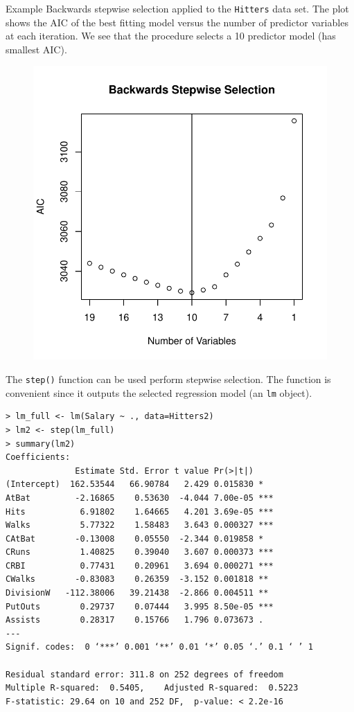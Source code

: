 \documentclass[10pt]{beamer}\usepackage[]{graphicx}\usepackage[]{color}
\begin{document}
\begin{frame}{Example}
Backwards stepwise selection applied to the \texttt{Hitters} data set. The plot shows the AIC of the best fitting model versus the number of predictor variables at each iteration.  We see that the procedure selects a 10 predictor model (has smallest AIC). 
\begin{figure}
\includegraphics[scale=0.5]{figure/bwdAIC}
\end{figure}
\end{frame}

\begin{frame}[fragile]
The \texttt{step()} function can be used perform stepwise selection.  The function is convenient since it outputs the selected regression model (an \texttt{lm} object).
\scriptsize
\begin{verbatim}
> lm_full <- lm(Salary ~ ., data=Hitters2)
> lm2 <- step(lm_full)
> summary(lm2)
Coefficients:
              Estimate Std. Error t value Pr(>|t|)    
(Intercept)  162.53544   66.90784   2.429 0.015830 *  
AtBat         -2.16865    0.53630  -4.044 7.00e-05 ***
Hits           6.91802    1.64665   4.201 3.69e-05 ***
Walks          5.77322    1.58483   3.643 0.000327 ***
CAtBat        -0.13008    0.05550  -2.344 0.019858 *  
CRuns          1.40825    0.39040   3.607 0.000373 ***
CRBI           0.77431    0.20961   3.694 0.000271 ***
CWalks        -0.83083    0.26359  -3.152 0.001818 ** 
DivisionW   -112.38006   39.21438  -2.866 0.004511 ** 
PutOuts        0.29737    0.07444   3.995 8.50e-05 ***
Assists        0.28317    0.15766   1.796 0.073673 .  
---
Signif. codes:  0 ‘***’ 0.001 ‘**’ 0.01 ‘*’ 0.05 ‘.’ 0.1 ‘ ’ 1

Residual standard error: 311.8 on 252 degrees of freedom
Multiple R-squared:  0.5405,	Adjusted R-squared:  0.5223 
F-statistic: 29.64 on 10 and 252 DF,  p-value: < 2.2e-16
\end{verbatim}
\end{frame}
\end{document}
